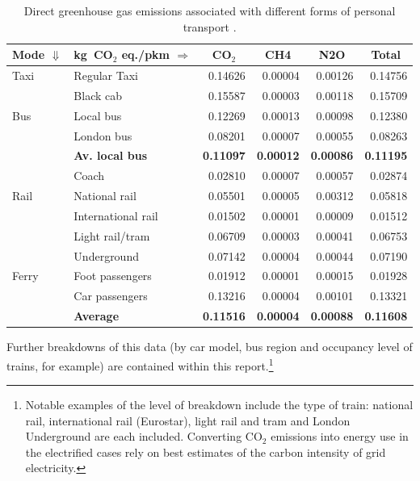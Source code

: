 \begin{table}[htbp]
\caption[Direct greenhouse gas emissions by mode]{Direct greenhouse gas
emissions associated with different forms of
personal transport \citep{Defra2011}.}
\begin{tabular}{llrrrr}
\toprule
\multicolumn{1}{c}{Mode $\Downarrow$} & \multicolumn{1}{c}{\textbf{kg~CO$_2$
eq./pkm $\Rightarrow$}} & \multicolumn{1}{c}{\textbf{CO$_2$}} &
\multicolumn{1}{c}{\textbf{CH4}} & \multicolumn{1}{c}{\textbf{N2O}} &
\multicolumn{1}{c}{\textbf{Total}} \\
\midrule
Taxi & Regular Taxi  & 0.14626 & 0.00004 & 0.00126 & 0.14756 \\
 & Black cab & 0.15587 & 0.00003 & 0.00118 & 0.15709 \\
Bus & Local bus  & 0.12269 & 0.00013 & 0.00098 & 0.12380 \\
 & London bus & 0.08201 & 0.00007 & 0.00055 & 0.08263 \\
 & \textbf{Av. local bus} & \textbf{0.11097} & \textbf{0.00012} &
\textbf{0.00086} & \textbf{0.11195} \\
 & Coach & 0.02810 & 0.00007 & 0.00057 & 0.02874 \\
Rail & National rail & 0.05501 & 0.00005 & 0.00312 & 0.05818 \\
 & International rail  & 0.01502 & 0.00001 & 0.00009 & 0.01512 \\
 & Light rail/tram & 0.06709 & 0.00003 & 0.00041 & 0.06753 \\
 & Underground & 0.07142 & 0.00004 & 0.00044 & 0.07190 \\
Ferry & Foot passengers & 0.01912 & 0.00001 & 0.00015 & 0.01928 \\
 & Car passengers & 0.13216 & 0.00004 & 0.00101 & 0.13321 \\
 & \textbf{Average} & \textbf{0.11516} & \textbf{0.00004} & \textbf{0.00088} &
\textbf{0.11608} \\
 \bottomrule
\end{tabular}
\label{tghgfactors}
\end{table}

Further breakdowns of this data (by car model, bus region and
occupancy level of trains, for example) are contained within 
this report.\footnote{Notable
examples of the level of breakdown include the type of train: national rail,
international rail (Eurostar), light rail and tram and London Underground
are each included. Converting CO$_2$ emissions into energy use in the
electrified cases rely on best estimates of the carbon intensity of grid
electricity.
}

